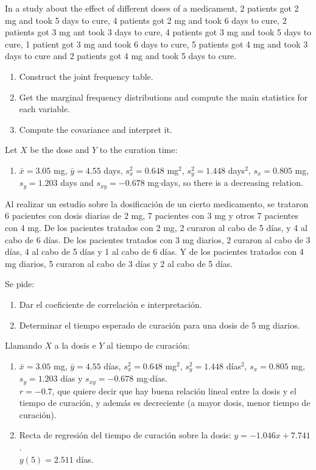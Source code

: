 {In a study about the effect of different doses of a medicament, 2 patients got 2 mg and took 5 days to cure, 4
patients got 2 mg and took 6 days to cure, 2 patients got 3 mg ant took 3 days to cure, 4 patients got 3 mg and took 5
days to cure, 1 patient got 3 mg and took 6 days to cure, 5 patients got 4 mg and took 3 days to cure and 2 patients got
4 mg and took 5 days to cure.
\begin{enumerate}
\item Construct the joint frequency table.
\item Get the marginal frequency distributions and compute the main statistics for each variable.
\item Compute the covariance and interpret it.
\end{enumerate}
}
{Let $X$ be the dose and $Y$ to the curation time:
\begin{enumerate}[start=3]
\item $\bar x=3.05$ mg, $\bar y=4.55$ days, $s_x^2=0.648$ mg$^2$, $s_y^2=1.448$ days$^2$, $s_x=0.805$ mg, $s_y=1.203$
days and $s_{xy}=-0.678$ mg$\cdot$days, so there is a decreasing relation.
\end{enumerate}
}
{}


{Al realizar un estudio sobre la dosificación de un cierto medicamento, se trataron 6 pacientes con dosis diarias de 2
mg, 7 pacientes con 3 mg y otros 7 pacientes con 4 mg. De los pacientes tratados con 2 mg, 2 curaron al cabo de 5 días,
y 4 al cabo de 6 días. De los pacientes tratados con 3 mg diarios, 2 curaron al cabo de 3 días, 4 al cabo de 5 días y 1
al cabo de 6 días. Y de los pacientes tratados con 4 mg diarios, 5 curaron al cabo de 3 días y 2 al cabo de 5 días.

Se pide:
\begin{enumerate}
\item Dar el coeficiente de correlación e interpretación.
\item Determinar el tiempo esperado de curación para una dosis de 5 mg diarios.
\end{enumerate}
}
{Llamando $X$ a la dosis e $Y$ al tiempo de curación:
\begin{enumerate}
\item $\bar x=3.05$ mg, $\bar y=4.55$ días, $s_x^2=0.648$ mg$^2$, $s_y^2=1.448$ días$^2$, $s_x=0.805$ mg, $s_y=1.203$
días y $s_{xy}=-0.678$ mg$\cdot$días.\\
$r=-0.7$, que quiere decir que hay buena relación lineal entre la dosis y el tiempo de curación, y además es
decreciente (a mayor dosis, menor tiempo de curación).
\item Recta de regresión del tiempo de curación sobre la dosis: $y=-1.046x+7.741$.\\
$y(5)=2.511$ días.
\end{enumerate}
}
{}


